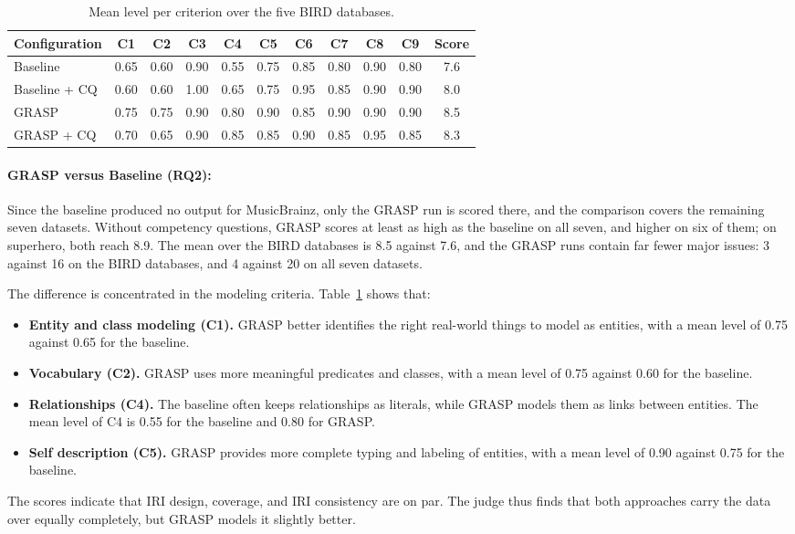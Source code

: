 \begin{table}[!htbp]
  \centering
  \small
  \renewcommand{\arraystretch}{1.3}
  \setlength{\tabcolsep}{4.5pt}
  \begin{tabular}{l c c c c c c c c c c}
    \hline
    \textbf{Configuration} & \textbf{C1} & \textbf{C2} & \textbf{C3} & \textbf{C4} & \textbf{C5} & \textbf{C6} & \textbf{C7} & \textbf{C8} & \textbf{C9} & \textbf{Score} \\
    \hline
    Baseline       & 0.65 & 0.60 & 0.90 & 0.55 & 0.75 & 0.85 & 0.80 & 0.90 & 0.80 & 7.6 \\
    Baseline + CQ  & 0.60 & 0.60 & 1.00 & 0.65 & 0.75 & 0.95 & 0.85 & 0.90 & 0.90 & 8.0 \\
    GRASP          & 0.75 & 0.75 & 0.90 & 0.80 & 0.90 & 0.85 & 0.90 & 0.90 & 0.90 & 8.5 \\
    GRASP + CQ     & 0.70 & 0.65 & 0.90 & 0.85 & 0.85 & 0.90 & 0.85 & 0.95 & 0.85 & 8.3 \\
    \hline
  \end{tabular}
  \caption[Mean judge level per criterion]{Mean level per criterion over the five BIRD databases.}
  \label{tab:judge-criteria}
\end{table}

\paragraph{GRASP versus Baseline (RQ2):}
Since the baseline produced no output for MusicBrainz, only the GRASP run is scored there, and the comparison covers the remaining seven datasets. Without competency questions, GRASP scores at least as high as the baseline on all seven, and higher on six of them; on superhero, both reach 8.9. The mean over the BIRD databases is 8.5 against 7.6, and the GRASP runs contain far fewer major issues: 3 against 16 on the BIRD databases, and 4 against 20 on all seven datasets. 

The difference is concentrated in the modeling criteria. Table~\ref{tab:judge-criteria} shows that:
\begin{itemize}[leftmargin=*, itemsep=2pt]
  \item \textbf{Entity and class modeling (C1).} GRASP better identifies the right real-world things to model as entities, with a mean level of 0.75 against 0.65 for the baseline.
  \item \textbf{Vocabulary (C2).} GRASP uses more meaningful predicates and classes, with a mean level of 0.75 against 0.60 for the baseline.
  \item \textbf{Relationships (C4).} The baseline often keeps relationships as literals, while GRASP models them as links between entities. The mean level of C4 is 0.55 for the baseline and 0.80 for GRASP.
  \item \textbf{Self description (C5).} GRASP provides more complete typing and labeling of entities, with a mean level of 0.90 against 0.75 for the baseline.
\end{itemize}
The scores indicate that IRI design, coverage, and IRI consistency are on par. The judge thus finds that both approaches carry the data over equally completely, but GRASP models it slightly better.

